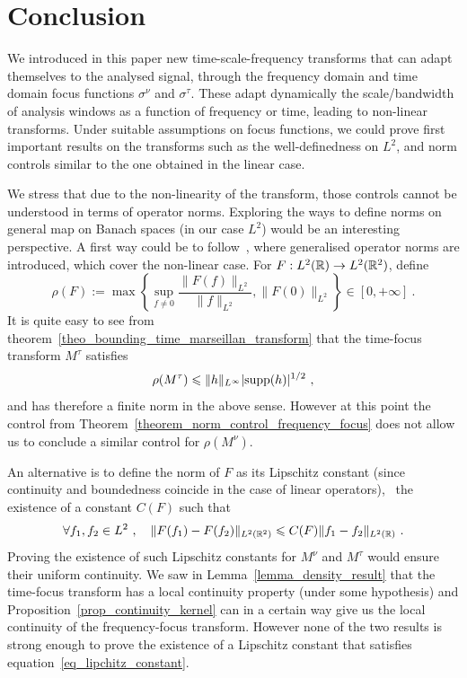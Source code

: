 \section{Conclusion}\label{sec_conclusion}

We introduced in this paper new time-scale-frequency transforms that can adapt themselves to the analysed signal, through the frequency domain and time domain focus functions $\sigma^\nu$ and $\sigma^\tau$. These adapt dynamically the scale/bandwidth of analysis windows as a function of frequency or time, leading to non-linear transforms. Under suitable assumptions on focus functions, we could prove first important results on the transforms such as the well-definedness on $L^2$, and norm controls similar to the one obtained in the linear case.

We stress that due to the non-linearity of the transform, those controls cannot be understood in terms of operator norms. Exploring the ways to define norms on general map on Banach spaces (in our case $L^2$) would be an interesting perspective. A first way could be to follow~\cite{wei2020development}, where generalised operator norms are introduced, which cover the non-linear case. For $F:L^2(\mathbb{R})\rightarrow L^2(\mathbb{R}^2)$, define
\begin{equation}
    \rho(F) := \max\left\{   \sup_{f\not=0}\frac{\|F(f)\|_{L^2}}{\|f\|_{L^2}}, \|F(0)\|_{L^2}  \right\} \in [0,+\infty]\ .
\end{equation}
It is quite easy to see from theorem~\ref{theo_bounding_time_marseillan_transform} that the time-focus transform $M^\tau$ satisfies
\begin{equation}
    \rho(M^\tau) \leqslant \|h\|_{L^\infty}|\text{supp}(h)|^{1/2}\ ,
\end{equation}
and has therefore a finite norm in the above sense. However at this point the control from Theorem~\ref{theorem_norm_control_frequency_focus} does not allow us to conclude a similar control for $\rho(M^\nu)$.

An alternative is to define the norm of $F$ as its Lipschitz constant (since continuity and boundedness coincide in the case of linear operators), \ie\, the existence of a constant $C(F)$ such that
\begin{equation}\label{eq_lipchitz_constant}
\forall f_1,f_2\in L^2\ ,\quad \|F(f_1) - F(f_2) \|_{L^2(\mathbb{R}^2)} \leqslant C(F)\|f_1-f_2\|_{L^2(\mathbb{R})}\ .
\end{equation}
Proving the existence of such Lipschitz constants for $M^\nu$ and  $M^\tau$ would ensure their uniform continuity. We saw in Lemma~\ref{lemma_density_result} that the time-focus transform has a local continuity property (under some hypothesis) and  Proposition~\ref{prop_continuity_kernel} can in a certain way give us the local continuity of the frequency-focus transform. However none of the two results is strong enough to prove the existence of a Lipschitz constant that satisfies equation~\eqref{eq_lipchitz_constant}.

